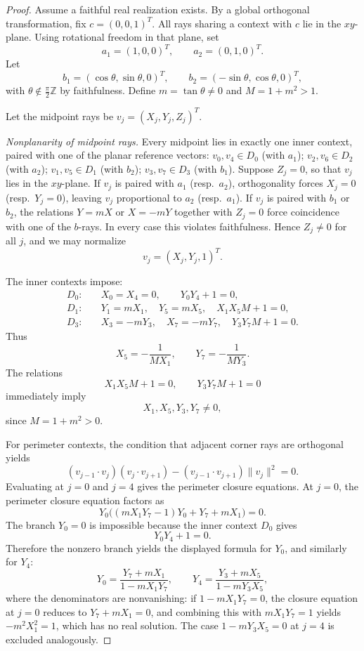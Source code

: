 \documentclass[
  twocolumn,
  aps,
  pra,
  floatfix,
  amsmath,amssymb,
  longbibliography
]{revtex4-2}
\theoremstyle{definition}
\theoremstyle{remark}
\begin{document}
\begin{proof}
Assume a faithful real realization exists. By a global orthogonal transformation, fix \(c=(0,0,1)^T\). All rays sharing a context with \(c\) lie in the \(xy\)-plane. Using rotational freedom in that plane, set
\[
  a_1=(1,0,0)^T,\qquad a_2=(0,1,0)^T.
\]
Let
\[
  b_1=(\cos\theta,\sin\theta,0)^T,\qquad b_2=(-\sin\theta,\cos\theta,0)^T,
\]
with \(\theta\notin \frac{\pi}{2}\mathbb{Z}\) by faithfulness. Define \(m=\tan\theta\neq 0\) and \(M=1+m^2>1\).

Let the midpoint rays be \(v_j=(X_j,Y_j,Z_j)^T\).

\medskip
\noindent\emph{Nonplanarity of midpoint rays.}
Every midpoint lies in exactly one inner context, paired with one of
the planar reference vectors:
\(v_0,v_4\in D_0\) (with \(a_1\));
\(v_2,v_6\in D_2\) (with \(a_2\));
\(v_1,v_5\in D_1\) (with \(b_2\));
\(v_3,v_7\in D_3\) (with \(b_1\)).
Suppose \(Z_j=0\), so that \(v_j\) lies in the \(xy\)-plane.
If \(v_j\) is paired with \(a_1\) (resp.\ \(a_2\)), orthogonality forces
\(X_j=0\) (resp.\ \(Y_j=0\)), leaving \(v_j\) proportional to \(a_2\)
(resp.\ \(a_1\)). If \(v_j\) is paired with \(b_1\) or \(b_2\), the
relations \(Y=mX\) or \(X=-mY\) together with \(Z_j=0\) force
coincidence with one of the \(b\)-rays. In every case this violates
faithfulness.
Hence \(Z_j\neq 0\) for all \(j\), and we may normalize
\[
  v_j=(X_j,Y_j,1)^T.
\]

The inner contexts impose:
\begin{align*}
D_0:&\quad X_0=X_4=0,\qquad Y_0Y_4+1=0,\\
D_1:&\quad Y_1=mX_1,\quad Y_5=mX_5,\quad X_1X_5 M+1=0,\\
D_3:&\quad X_3=-mY_3,\quad X_7=-mY_7,\quad Y_3Y_7 M+1=0.
\end{align*}
Thus
\[
  X_5=-\frac{1}{M X_1},\qquad Y_7=-\frac{1}{M Y_3}.
\]
The relations
\[
X_1X_5M+1=0,\qquad Y_3Y_7M+1=0
\]
immediately imply
\[
X_1,X_5,Y_3,Y_7\neq0,
\]
since \(M=1+m^2>0\).

For perimeter contexts, the condition that adjacent corner rays are orthogonal yields
\[
  (v_{j-1}\cdot v_j)(v_j\cdot v_{j+1})-(v_{j-1}\cdot v_{j+1})\|v_j\|^2=0.
\]
Evaluating at \(j=0\) and \(j=4\) gives the perimeter closure equations. At \(j=0\), the perimeter closure equation factors as
\[
Y_0\bigl((mX_1Y_7-1)Y_0+Y_7+mX_1\bigr)=0.
\]
The branch \(Y_0=0\) is impossible because the inner context \(D_0\) gives
\[
Y_0Y_4+1=0.
\]
Therefore the nonzero branch yields the displayed formula for \(Y_0\), and similarly for \(Y_4\):
\begin{equation}
Y_0 = \frac{Y_7+mX_1}{1-mX_1Y_7}, \qquad
Y_4 = \frac{Y_3+mX_5}{1-mY_3X_5}, \label{eq:Y0a4tight}
\end{equation}
where the denominators are nonvanishing: if \(1-mX_1Y_7=0\), the
closure equation at \(j=0\) reduces to \(Y_7+mX_1=0\), and combining
this with \(mX_1Y_7=1\) yields \(-m^2X_1^2=1\), which has no real
solution. The case \(1-mY_3X_5=0\) at \(j=4\) is excluded analogously.


\end{proof}
\end{document}
